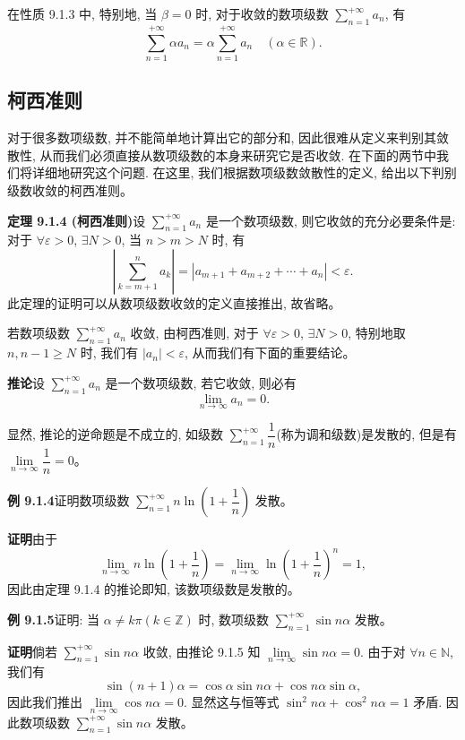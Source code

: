 \documentclass[UTF8, 12pt, fontset=fandol, oneside]{ctexart}
\begin{document}
在性质 9.1.3 中, 特别地, 当 $\beta=0$ 时, 对于收敛的数项级数 $\sum\limits_{n=1}^{+\infty}a_n$, 有
\[
  \sum_{n=1}^{+\infty}\alpha a_n=\alpha\sum_{n=1}^{+\infty}a_n\quad(\alpha\in\mathbb R).
\]

\subsection{柯西准则}

对于很多数项级数, 并不能简单地计算出它的部分和, 因此很难从定义来判别其敛散性, 从而我们必须直接从数项级数的本身来研究它是否收敛. 在下面的两节中我们将详细地研究这个问题. 在这里, 我们根据数项级数敛散性的定义, 给出以下判别级数收敛的柯西准则。

\noindent\textbf{定理 9.1.4 (柯西准则)}\quad 设 $\sum\limits_{n=1}^{+\infty}a_n$ 是一个数项级数, 则它收敛的充分必要条件是: 对于 $\forall\varepsilon>0$, $\exists N>0$, 当 $n>m>N$ 时, 有
\[
  \left|\sum_{k=m+1}^n a_k\right|
  =|a_{m+1}+a_{m+2}+\cdots+a_n|<\varepsilon.
\]
此定理的证明可以从数项级数收敛的定义直接推出, 故省略。

若数项级数 $\sum\limits_{n=1}^{+\infty}a_n$ 收敛, 由柯西准则, 对于 $\forall\varepsilon>0$, $\exists N>0$, 特别地取 $n,n-1\geq N$ 时, 我们有 $|a_n|<\varepsilon$, 从而我们有下面的重要结论。

\noindent\textbf{推论}\quad 设 $\sum\limits_{n=1}^{+\infty}a_n$ 是一个数项级数, 若它收敛, 则必有
\[
  \lim_{n\to\infty}a_n=0.
\]

显然, 推论的逆命题是不成立的, 如级数 $\sum\limits_{n=1}^{+\infty}\dfrac1n$(称为调和级数)是发散的, 但是有 $\lim\limits_{n\to\infty}\dfrac1n=0$。

\noindent\textbf{例 9.1.4}\quad 证明数项级数 $\sum\limits_{n=1}^{+\infty}n\ln\left(1+\dfrac1n\right)$ 发散。

\noindent\textbf{证明}\quad 由于
\[
  \lim_{n\to\infty}n\ln\left(1+\frac1n\right)
  =\lim_{n\to\infty}\ln\left(1+\frac1n\right)^n=1,
\]
因此由定理 9.1.4 的推论即知, 该数项级数是发散的。

\noindent\textbf{例 9.1.5}\quad 证明: 当 $\alpha\neq k\pi(k\in\mathbb Z)$ 时, 数项级数 $\sum\limits_{n=1}^{+\infty}\sin n\alpha$ 发散。

\noindent\textbf{证明}\quad 倘若 $\sum\limits_{n=1}^{+\infty}\sin n\alpha$ 收敛, 由推论 9.1.5 知 $\lim\limits_{n\to\infty}\sin n\alpha=0$. 由于对 $\forall n\in\mathbb N$, 我们有
\[
  \sin(n+1)\alpha=\cos\alpha\sin n\alpha+\cos n\alpha\sin\alpha,
\]
因此我们推出 $\lim\limits_{n\to\infty}\cos n\alpha=0$. 显然这与恒等式 $\sin^2n\alpha+\cos^2n\alpha=1$ 矛盾. 因此数项级数 $\sum\limits_{n=1}^{+\infty}\sin n\alpha$ 发散。
\end{document}
